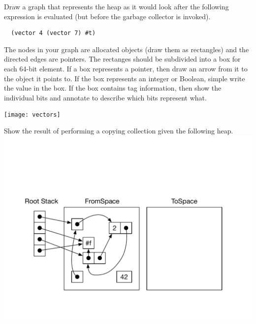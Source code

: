 \documentclass[12pt,answers]{exam}
\begin{document}
\begin{questions}

\pagebreak

\question[14] Draw a graph that represents the heap as it would look
after the following expression is evaluated (but before the garbage
collector is invoked). 
\begin{lstlisting}
  (vector 4 (vector 7) #t)
\end{lstlisting}
The nodes in your graph are allocated objects
(draw them as rectangles) and the directed edges are pointers.  The
rectanges should be subdivided into a box for each 64-bit element. If
a box represents a pointer, then draw an arrow from it to the object
it points to. If the box represents an integer or Boolean, simple
write the value in the box. If the box contains tag information, then
show the individual bits and annotate to describe which bits represent
what.

\begin{solution}[4in]

\texttt{[image: vectors]}
\end{solution}

\pagebreak
\question[14] Show the result of performing a copying collection given
the following heap.
\includegraphics[width=6.5in]{copy-collect}


\begin{solution}


\end{solution}
\end{questions}
\end{document}

